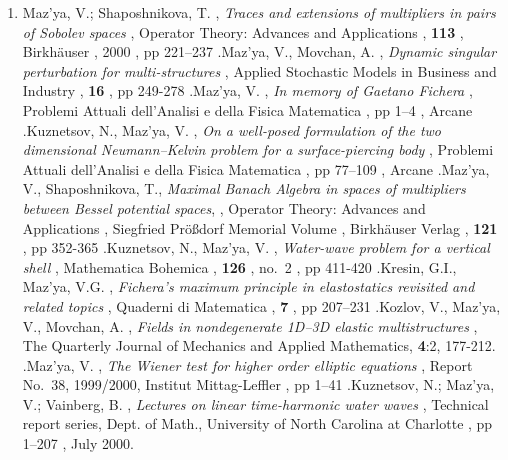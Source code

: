 \documentclass{article}
\newcommand{\authors}[1]{\item #1\ignorespaces}
\renewcommand{\title}[1]{, \textit{#1}\ignorespaces}
\newcommand{\journal}[1]{, {#1}\ignorespaces}
\newcommand{\book}[1]{, {#1}\ignorespaces}
\newcommand{\series}[1]{, {#1}\ignorespaces}
\newcommand{\publisher}[1]{, {#1}\ignorespaces}
\newcommand{\conference}[1]{, {#1}\ignorespaces}
\newcommand{\volume}[1]{, \textbf{#1}\ignorespaces}
\newcommand{\no}[1]{, no.~{#1}\ignorespaces}
\newcommand{\Year}[1]{, #1\ignorespaces}
\newcommand{\pages}[1]{, pp #1\ignorespaces}
\newcommand{\jitem}[1]{.}
\begin{document}
\begin{enumerate}
\authors{Maz'ya, V.; Shaposhnikova, T.}
\title{Traces and extensions of
multipliers in pairs of Sobolev spaces}
\journal{Operator Theory: Advances and Applications}
\volume{113}
\publisher{Birkh\"auser}
\Year{2000}
\pages{221--237}
\jitem

\authors{Maz'ya, V., Movchan, A.}
\title{Dynamic singular perturbation for multi-structures}
\journal{Applied Stochastic Models in Business and Industry}
\volume{16}
\pages{249-278}
\jitem


\authors{Maz'ya, V.}
\title{In memory of Gaetano Fichera}
\book{Problemi Attuali dell'Analisi e della Fisica Matematica}
\pages{1--4}
\publisher{Arcane}
\jitem

\authors{Kuznetsov, N., Maz'ya, V.}
\title{On a well-posed formulation of the two dimensional
Neumann--Kelvin
problem for a surface-piercing body}
\book{Problemi Attuali dell'Analisi e della Fisica Matematica}
\pages{77--109}
\publisher{Arcane}
\jitem






\item  Maz'ya, V., Shaposhnikova, T., {\it Maximal Banach Algebra in
spaces
     of multipliers between Bessel potential spaces},
     \series{Operator Theory: Advances and Applications}
     \conference{Siegfried Pr\"o{\ss}dorf Memorial Volume}
     \publisher{Birkh\"auser Verlag}
\volume{121}
\pages{352-365}
\jitem


\authors{Kuznetsov, N., Maz'ya, V.}
\title{Water-wave problem for a vertical shell}
\journal{Mathematica Bohemica}
\volume{126}
\no{2}
\pages{411-420}
\jitem




\authors{Kresin, G.I., Maz'ya, V.G.}
\title{Fichera's maximum principle in elastostatics revisited and
related
topics}
\journal{Quaderni di Matematica}
\volume{7}
\pages{207--231}
\jitem

\authors{Kozlov, V., Maz'ya, V., Movchan, A.}
\title{Fields in nondegenerate 1D--3D elastic multistructures}
\journal{The Quarterly Journal of Mechanics and Applied Mathematics},
{\bf
4}:2, 177-212.
\jitem

\authors{Maz'ya, V.}
\title{The Wiener test for higher order elliptic equations}
\journal{Report No.~38, 1999/2000, Institut  Mittag-Leffler}
\pages{1--41}
\jitem

\authors{Kuznetsov, N.; Maz'ya, V.; Vainberg, B.}
\title{Lectures on linear time-harmonic water waves}
\journal{Technical report series, Dept. of Math., University of North
Carolina at Charlotte}
\pages{1--207}
\Year{July 2000.}


\end{enumerate}
\end{document}
